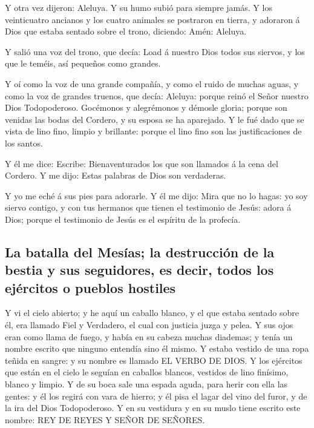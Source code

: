  Y otra vez dijeron: Aleluya. Y su humo subió para siempre
jamás.  Y los veinticuatro ancianos y los cuatro animales se
postraron en tierra, y adoraron á Dios que estaba sentado sobre el
trono, diciendo: Amén: Aleluya.

 Y salió una voz del trono, que decía: Load á nuestro Dios
todos sus siervos, y los que le teméis, así pequeños como grandes.

 Y oí como la voz de una grande compañía, y como el ruido de
muchas aguas, y como la voz de grandes truenos, que decía: Aleluya:
porque reinó el Señor nuestro Dios Todopoderoso.  Gocémonos
y alegrémonos y démosle gloria; porque son venidas las bodas del
Cordero, y su esposa se ha aparejado.  Y le fué dado que se
vista de lino fino, limpio y brillante: porque el lino fino son las
justificaciones de los santos.

 Y él me dice: Escribe: Bienaventurados los que son llamados
á la cena del Cordero. Y me dijo: Estas palabras de Dios son verdaderas.

 Y yo me eché á sus pies para adorarle. Y él me dijo: Mira
que no lo hagas: yo soy siervo contigo, y con tus hermanos que tienen el
testimonio de Jesús: adora á Dios; porque el testimonio de Jesús es el
espíritu de la profecía.

\hypertarget{la-batalla-del-mesuxedas-la-destrucciuxf3n-de-la-bestia-y-sus-seguidores-es-decir-todos-los-ejuxe9rcitos-o-pueblos-hostiles}{%
\subsection{La batalla del Mesías; la destrucción de la bestia y sus
seguidores, es decir, todos los ejércitos o pueblos
hostiles}\label{la-batalla-del-mesuxedas-la-destrucciuxf3n-de-la-bestia-y-sus-seguidores-es-decir-todos-los-ejuxe9rcitos-o-pueblos-hostiles}}

 Y vi el cielo abierto; y he aquí un caballo blanco, y el
que estaba sentado sobre él, era llamado Fiel y Verdadero, el cual con
justicia juzga y pelea.  Y sus ojos eran como llama de
fuego, y había en su cabeza muchas diademas; y tenía un nombre escrito
que ninguno entendía sino él mismo.  Y estaba vestido de
una ropa teñida en sangre: y su nombre es llamado EL VERBO DE DIOS.
 Y los ejércitos que están en el cielo le seguían en
caballos blancos, vestidos de lino finísimo, blanco y limpio.
 Y de su boca sale una espada aguda, para herir con ella
las gentes: y él los regirá con vara de hierro; y él pisa el lagar del
vino del furor, y de la ira del Dios Todopoderoso.  Y en su
vestidura y en su muslo tiene escrito este nombre: REY DE REYES Y SEÑOR
DE SEÑORES.

